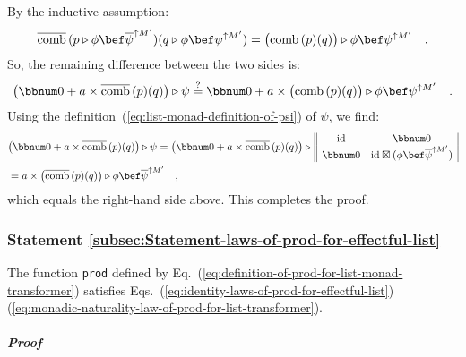 By the inductive assumption:
\[
\overline{\text{comb}}\,(p\triangleright\phi\bef\overline{\psi}^{\uparrow M^{\prime}})(q\triangleright\phi\bef\psi^{\uparrow M^{\prime}})=\big(\text{comb}\,(p)(q)\big)\triangleright\phi\bef\psi^{\uparrow M^{\prime}}\quad.
\]
So, the remaining difference between the two sides is:
\[
\big(\bbnum 0+a\times\overline{\text{comb}}\,(p)(q)\big)\triangleright\psi\overset{?}{=}\bbnum 0+a\times\big(\text{comb}\,(p)(q)\big)\triangleright\phi\bef\psi^{\uparrow M^{\prime}}\quad.
\]
Using the definition~(\ref{eq:list-monad-definition-of-psi}) of
$\psi$, we find:
\begin{align*}
 & \big(\bbnum 0+a\times\overline{\text{comb}}\,(p)(q)\big)\triangleright\psi=\big(\bbnum 0+a\times\overline{\text{comb}}\,(p)(q)\big)\triangleright\,\begin{array}{||cc|}
\text{id} & \bbnum 0\\
\bbnum 0 & \text{id}\boxtimes(\phi\bef\overline{\psi}^{\uparrow M^{\prime}})
\end{array}\\
 & =a\times\big(\overline{\text{comb}}\,(p)(q)\big)\triangleright\phi\bef\overline{\psi}^{\uparrow M^{\prime}}\quad,
\end{align*}
which equals the right-hand side above. This completes the proof.

\subsubsection{Statement \label{subsec:Statement-laws-of-prod-for-effectful-list}\ref{subsec:Statement-laws-of-prod-for-effectful-list}}

The function \lstinline!prod! defined by Eq.~(\ref{eq:definition-of-prod-for-list-monad-transformer})
satisfies Eqs.~(\ref{eq:identity-laws-of-prod-for-effectful-list})\textendash (\ref{eq:monadic-naturality-law-of-prod-for-list-transformer}).

\subparagraph{Proof}

